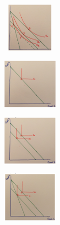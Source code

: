 \documentclass[11pt, english]{article}
\begin{document}
\begin{figure}[H]
\begin{center}
\begin{subfigure}[t]{3.5cm}
\begin{center}
                        \includegraphics[width=3cm,height=2.5cm]{EC315-IMG/39.png}
                \end{center}
                \end{subfigure}
	\quad
                \begin{subfigure}[t]{3.5cm}
                \begin{center}
                        \includegraphics[width=3cm,height=2.5cm]{EC315-IMG/40.png}
                \end{center}
                \end{subfigure}
                \begin{subfigure}[t]{3.5cm}
                \begin{center}
                        \includegraphics[width=3cm,height=2.5cm]{EC315-IMG/41.png}
                \end{center}
                \end{subfigure}
                \begin{subfigure}[t]{3.5cm}
                \begin{center}
                        \includegraphics[width=3cm,height=2.5cm]{EC315-IMG/42.png}
                \end{center}
                \end{subfigure}
        \end{center}
        \end{figure}
\end{document}
